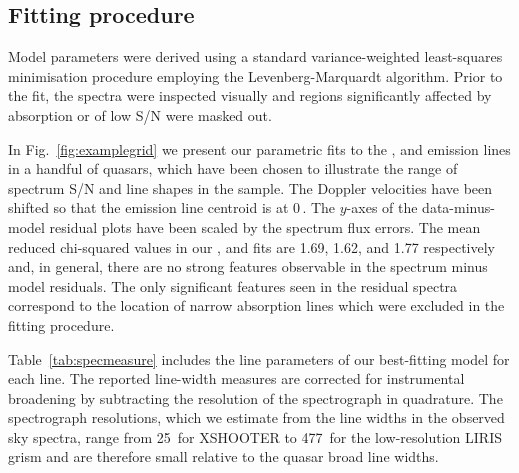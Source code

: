 \subsection{Fitting procedure}

Model parameters were derived using a standard variance-weighted least-squares minimisation procedure employing the Levenberg-Marquardt algorithm. 
Prior to the fit, the spectra were inspected visually and regions significantly affected by absorption or of low S/N were masked out.

In Fig.~\ref{fig:examplegrid} we present our parametric fits to the , \ha and \hb emission lines in a handful of quasars, which have been chosen to illustrate the range of spectrum S/N and line shapes in the sample.  
The Doppler velocities have been shifted so that the \ha emission line centroid is at 0\,\kms. 
The $y$-axes of the data-minus-model residual plots have been scaled by the spectrum flux errors.
The mean reduced chi-squared values in our \hans, \hb and  fits are 1.69, 1.62, and 1.77 respectively and, in general, there are no strong features observable in the spectrum minus model residuals. 
The only significant features seen in the residual  spectra correspond to the location of narrow absorption lines which were excluded in the fitting procedure.

Table~\ref{tab:specmeasure} includes the line parameters of our best-fitting model for each line.
The reported line-width measures are corrected for instrumental broadening by subtracting the resolution of the spectrograph in quadrature. 
The spectrograph resolutions, which we estimate from the line widths in the observed sky spectra, range from 25\kms\, for XSHOOTER to 477\kms\, for the low-resolution LIRIS grism and are therefore small relative to the quasar broad line widths.

